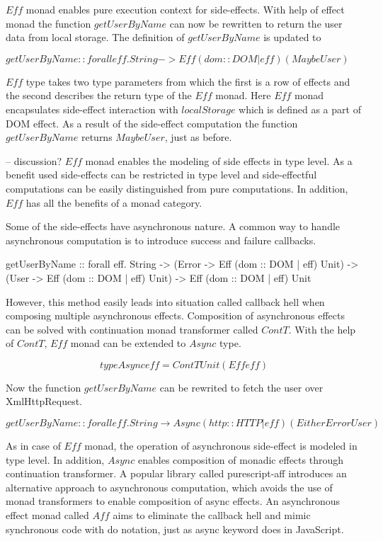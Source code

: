 \documentclass[article]{aaltoseries}
\begin{document}
      $Eff$ monad enables pure execution context for side-effects. With help of effect
      monad the function $getUserByName$ can now be rewritten to return the user data
      from local storage. The definition of $getUserByName$ is updated to

      $getUserByName :: forall eff. String -> Eff (dom :: DOM | eff) (Maybe User)$
 
      $Eff$ type takes two type parameters from which the first is a row of
      effects and the second describes the return type of the $Eff$ monad. Here
      $Eff$ monad encapsulates side-effect interaction with $localStorage$ which is
      defined as a part of DOM effect. As a result of the side-effect
      computation the function $getUserByName$ returns $Maybe User$, just as before.
 
      -- discussion?
      $Eff$ monad enables the modeling of side effects in type level. As a benefit
      used side-effects can be restricted in type level and side-effectful
      computations can be easily distinguished from pure computations. In
      addition, $Eff$ has all the benefits of a monad category.
 
      Some of the side-effects have asynchronous nature. A common way to handle
      asynchronous computation is to introduce success and failure callbacks.
 
      getUserByName :: forall eff. String -> (Error -> Eff (dom :: DOM | eff)
      Unit) -> (User -> Eff (dom :: DOM | eff) Unit) -> Eff (dom :: DOM | eff)
      Unit
 
      However, this method easily leads into situation called callback hell when
      composing multiple asynchronous effects. Composition of asynchronous
      effects can be solved with continuation monad transformer called $ContT$.
      With the help of $ContT$, $Eff$ monad can be extended to $Async$ type.
 
      \[type Async eff = ContT Unit (Eff eff)\]
 
      Now the function $getUserByName$ can be rewrited to fetch the user over XmlHttpRequest.
 
      \[getUserByName :: forall eff. String \rightarrow Async (http :: HTTP | eff) (Either Error User)\]
 
      As in case of $Eff$ monad, the operation of asynchronous side-effect is
      modeled in type level. In addition, $Async$ enables composition of monadic
      effects through continuation transformer. A popular library called
      purescript-aff introduces an alternative approach to asynchronous
      computation, which avoids the use of monad transformers to enable
      composition of async effects. An asynchronous effect monad called $Aff$ aims
      to eliminate the callback hell and mimic synchronous code with do
      notation, just as async keyword does in JavaScript.
 
\end{document}
